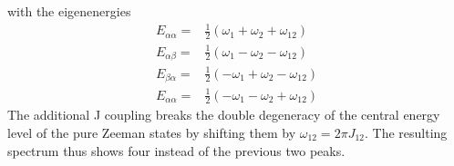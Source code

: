             with the eigenenergies
            \begin{align}
                E_{\alpha\alpha} =& \tfrac{1}{2} ( \omega_1 + \omega_2 + \omega_{12})\\
                E_{\alpha\beta}  =& \tfrac{1}{2} ( \omega_1 - \omega_2 - \omega_{12})\\
                E_{\beta\alpha}  =& \tfrac{1}{2} (-\omega_1 + \omega_2 - \omega_{12})\\
                E_{\alpha\alpha} =& \tfrac{1}{2} (-\omega_1 - \omega_2 + \omega_{12})
            \end{align}
            The additional J coupling breaks the double degeneracy of the central energy level of the pure Zeeman states by shifting them by $\omega_{12} = 2\pi J_{12}$. The resulting spectrum thus shows four instead of the previous two peaks.
